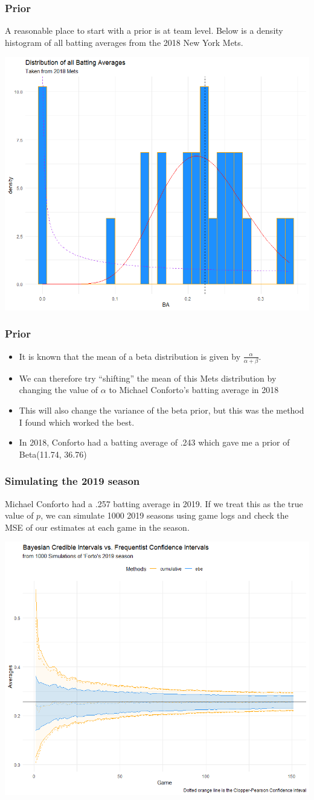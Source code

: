 \documentclass{beamer}
\begin{document}
\begin{frame}
	\frametitle{Prior}
	A reasonable place to start with a prior is at team level.
	Below is a density histogram of all batting averages from the 2018 New York Mets.\cite{lahman}
\begin{center}
	\includegraphics[height=.5\linewidth,width=.7\textwidth]{2018_mets_prior}
\end{center}
\end{frame}

\begin{frame}
	\frametitle{Prior}
	\begin{itemize}
		\item It is known that the mean of a beta distribution is given by $\frac{\alpha}{\alpha+\beta}$.
		\item We can therefore try ``shifting'' the mean of this Mets distribution by changing the value of $\alpha$ to Michael Conforto's batting average in 2018 
		\item This will also change the variance of the beta prior, but this was the method I found which worked the best.
		\item In 2018, Conforto had a batting average of .243 which gave me a prior of Beta(11.74, 36.76)
	\end{itemize}
\end{frame}

\begin{frame}
	\frametitle{Simulating the 2019 season}
	Michael Conforto had a .257 batting average in 2019. If we treat this as the true value of $p$, we can simulate 1000 2019 seasons using game logs and check the MSE of our estimates at each game in the season.
	\begin{center}
		\includegraphics[height=.53\linewidth,width=.7\textwidth]{intervals_2019}
	\end{center}
\end{frame}
\end{document}
